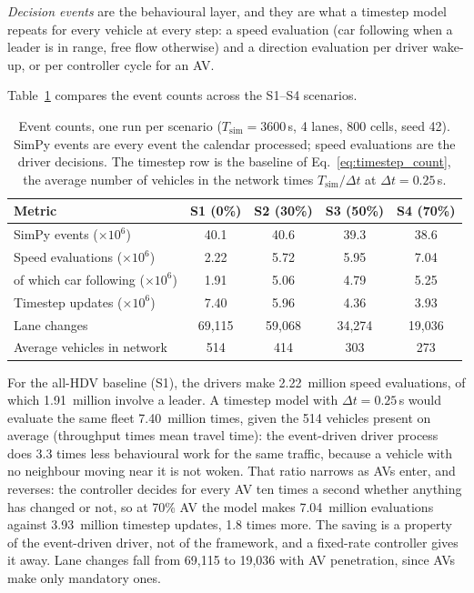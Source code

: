 \documentclass[review,number]{elsarticle}
\begin{document}
\emph{Decision events} are the behavioural layer, and they are what a timestep model repeats for every vehicle at every step: a speed evaluation (car following when a leader is in range, free flow otherwise) and a direction evaluation per driver wake-up, or per controller cycle for an AV.

Table~\ref{tab:computational} compares the event counts across the S1--S4 scenarios.

\begin{table}[ht]
\centering
\caption{Event counts, one run per scenario ($T_{\text{sim}} = 3600$\,s, 4 lanes, 800 cells, seed 42). SimPy events are every event the calendar processed; speed evaluations are the driver decisions. The timestep row is the baseline of Eq.~\eqref{eq:timestep_count}, the average number of vehicles in the network times $T_{\text{sim}} / \Delta t$ at $\Delta t = 0.25$\,s.}
\label{tab:computational}
\begin{tabular}{@{}lcccc@{}}
\toprule
Metric & S1 (0\%) & S2 (30\%) & S3 (50\%) & S4 (70\%) \\
\midrule
SimPy events ($\times 10^6$) & 40.1 & 40.6 & 39.3 & 38.6 \\
Speed evaluations ($\times 10^6$) & 2.22 & 5.72 & 5.95 & 7.04 \\
of which car following ($\times 10^6$) & 1.91 & 5.06 & 4.79 & 5.25 \\
Timestep updates ($\times 10^6$) & 7.40 & 5.96 & 4.36 & 3.93 \\
Lane changes & 69{,}115 & 59{,}068 & 34{,}274 & 19{,}036 \\
Average vehicles in network & 514 & 414 & 303 & 273 \\
\bottomrule
\end{tabular}
\end{table}

For the all-HDV baseline (S1), the drivers make 2.22~million speed evaluations, of which 1.91~million involve a leader. A timestep model with $\Delta t = 0.25$\,s would evaluate the same fleet 7.40~million times, given the 514 vehicles present on average (throughput times mean travel time): the event-driven driver process does 3.3 times less behavioural work for the same traffic, because a vehicle with no neighbour moving near it is not woken. That ratio narrows as AVs enter, and reverses: the controller decides for every AV ten times a second whether anything has changed or not, so at 70\% AV the model makes 7.04~million evaluations against 3.93~million timestep updates, 1.8 times more. The saving is a property of the event-driven driver, not of the framework, and a fixed-rate controller gives it away. Lane changes fall from 69{,}115 to 19{,}036 with AV penetration, since AVs make only mandatory ones.
\end{document}
